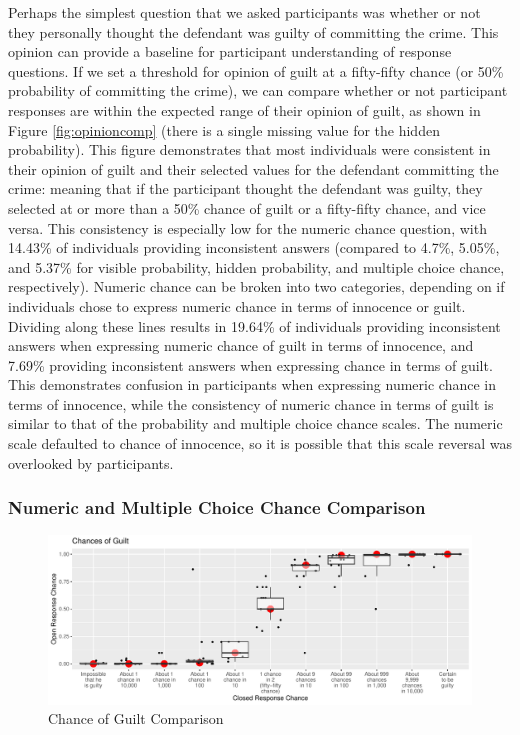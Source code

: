 \documentclass[print]{nuthesis}
\begin{document}
Perhaps the simplest question that we asked participants was whether or not they personally thought the defendant was guilty of committing the crime.
This opinion can provide a baseline for participant understanding of response questions.
If we set a threshold for opinion of guilt at a fifty-fifty chance (or 50\% probability of committing the crime), we can compare whether or not participant responses are within the expected range of their opinion of guilt, as shown in Figure \ref{fig:opinioncomp} (there is a single missing value for the hidden probability).
This figure demonstrates that most individuals were consistent in their opinion of guilt and their selected values for the defendant committing the crime: meaning that if the participant thought the defendant was guilty, they selected at or more than a 50\% chance of guilt or a fifty-fifty chance, and vice versa.
This consistency is especially low for the numeric chance question, with 14.43\% of individuals providing inconsistent answers (compared to 4.7\%, 5.05\%, and 5.37\% for visible probability, hidden probability, and multiple choice chance, respectively).
Numeric chance can be broken into two categories, depending on if individuals chose to express numeric chance in terms of innocence or guilt.
Dividing along these lines results in 19.64\% of individuals providing inconsistent answers when expressing numeric chance of guilt in terms of innocence, and 7.69\% providing inconsistent answers when expressing chance in terms of guilt.
This demonstrates confusion in participants when expressing numeric chance in terms of innocence, while the consistency of numeric chance in terms of guilt is similar to that of the probability and multiple choice chance scales.
The numeric scale defaulted to chance of innocence, so it is possible that this scale reversal was overlooked by participants.

\hypertarget{numeric-and-multiple-choice-chance-comparison}{%
\subsubsection{Numeric and Multiple Choice Chance Comparison}\label{numeric-and-multiple-choice-chance-comparison}}

\begin{figure}

{\centering \includegraphics[width=\linewidth]{thesis_files/figure-latex/likecomp1-1} 

}

\caption{Chance of Guilt Comparison}\label{fig:likecomp1}
\end{figure}
\end{document}
